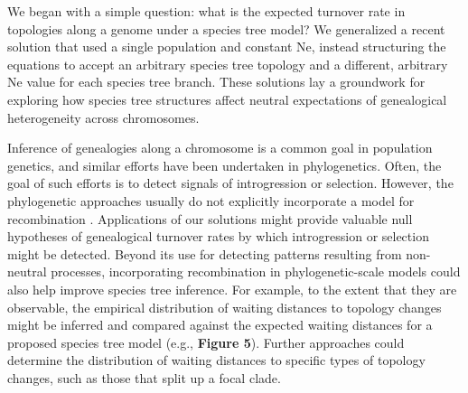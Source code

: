\documentclass[11pt]{article}
\begin{document}
 We began with a simple question: what is the expected turnover rate in topologies along a genome under a species tree model? We generalized a recent solution that used a single population and constant Ne, instead structuring the equations to accept an arbitrary species tree topology and a different, arbitrary Ne value for each species tree branch. These solutions lay a groundwork for exploring how species tree structures affect neutral expectations of genealogical heterogeneity across chromosomes.


Inference of genealogies along a chromosome is a common goal in population genetics, and similar efforts have been undertaken in phylogenetics. Often, the goal of such efforts is to detect signals of introgression or selection. However, the phylogenetic approaches usually do not explicitly incorporate a model for recombination \citep[e.g.,][]{li2019recombination}. Applications of our solutions might provide valuable null hypotheses of genealogical turnover rates by which introgression or selection might be detected. Beyond its use for detecting patterns resulting from non-neutral processes, incorporating recombination in phylogenetic-scale models could also help improve species tree inference. For example, to the extent that they are observable, the empirical distribution of waiting distances to topology changes might be inferred and compared against the expected waiting distances for a proposed species tree model (e.g., \textbf{Figure 5}). Further approaches could determine the distribution of waiting distances to specific types of topology changes, such as those that split up a focal clade.
\end{document}
